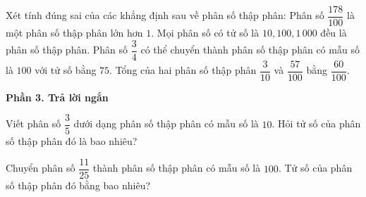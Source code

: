 \begin{ex} %
Xét tính đúng sai của các khẳng định sau về phân số thập phân:
\choiceTF
{\True Phân số $\dfrac{178}{100}$ là một phân số thập phân lớn hơn $1$.}
{Mọi phân số có tử số là $10, 100, 1\,000$ đều là phân số thập phân.}
{\True Phân số $\dfrac{3}{4}$ có thể chuyển thành phân số thập phân có mẫu số là $100$ với tử số bằng $75$.}
{Tổng của hai phân số thập phân $\dfrac{3}{10}$ và $\dfrac{57}{100}$ bằng $\dfrac{60}{100}$.}
\end{ex}

\textbf{Phần 3. Trả lời ngắn}

\begin{ex} %
Viết phân số $\dfrac{3}{5}$ dưới dạng phân số thập phân có mẫu số là $10$. Hỏi tử số của phân số thập phân đó là bao nhiêu?
\end{ex}

\begin{ex} %
Chuyển phân số $\dfrac{11}{25}$ thành phân số thập phân có mẫu số là $100$. Tử số của phân số thập phân đó bằng bao nhiêu?
\end{ex}

